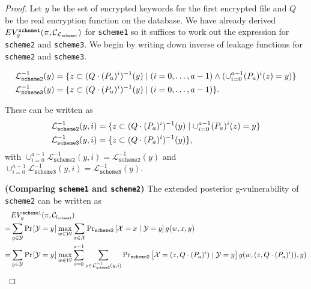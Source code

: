 \begin{proof}
Let $y$ be the set of encrypted keywords for the first encrypted file and $Q$ be the real encryption function on the database. We have already derived $EV_g^{\texttt{scheme1}}(\pi, \mathcal{C}_{\mathcal{L}_\texttt{scheme1}})$ for \texttt{scheme1} so it suffices to work out the expression for \texttt{scheme2} and \texttt{scheme3}. We begin by writing down inverse of leakage functions for \texttt{scheme2} and \texttt{scheme3}.

\begin{align*}
	\mathcal{L}_\texttt{scheme2}^{-1}(y) & = \{ z \subset (Q \cdot (P_a)^i)^{-1} (y) \mid (i = 0, \dots, a-1) \wedge (\cup_{i=0}^{a-1} (P_a)^i (z) = y) \} \\
	\mathcal{L}_\texttt{scheme3}^{-1}(y) & = \{ z \subset (Q \cdot (P_a)^i)^{-1} (y) \mid (i  = 0, \dots, a-1)\}.
\end{align*}

These can be written as
\begin{align*}
\mathcal{L}_\texttt{scheme2}^{-1}(y,i) & = \{ z \subset (Q \cdot (P_a)^i)^{-1} (y) \mid \cup_{i=0}^{a-1} (P_a)^i (z) = y \} \\
\mathcal{L}_\texttt{scheme3}^{-1}(y,i) & = \{ z \subset (Q \cdot (P_a)^i)^{-1} (y)\},
\end{align*}
with $\cup_{i=0}^{a-1} \mathcal{L}_\texttt{scheme2}^{-1}(y,i) = \mathcal{L}_\texttt{scheme2}^{-1}(y)$ and $\cup_{i=0}^{a-1} \mathcal{L}_\texttt{scheme3}^{-1}(y,i) = \mathcal{L}_\texttt{scheme3}^{-1}(y)$.

\textbf{(Comparing \texttt{scheme1} and \texttt{scheme2})} The extended posterior g-vulnerability of \texttt{scheme2} can be written as
\begin{align*}
  &EV_g^{\texttt{scheme1}}(\pi, \channel_{\leak_\texttt{scheme2}})\\
= &\sum_{y \in {\mathcal{Y}}} \prob{\mathcal{Y} = y} \max_{w \in {\mathcal{W}}} \sum_{x \in {\mathcal{X}}} \text{Pr}_{\texttt{scheme2}}\left[\mathcal{X} = x \mid \mathcal{Y} = y\right] g(w, x, y)\\
= &\sum_{y \in {\mathcal{Y}}} \prob{\mathcal{Y} = y} \max_{w \in {\mathcal{W}}} \sum_{i = 0}^{a-1} \sum_{z \in \mathcal{L}_\texttt{scheme2}^{-1}(y,i)} \text{Pr}_{\texttt{scheme2}}\left[\mathcal{X} = (z, Q \cdot (\perm_a)^i) \mid \mathcal{Y} = y\right] g(w, (z, Q \cdot (\perm_a)^i)), y)
\end{align*}


\end{proof}
